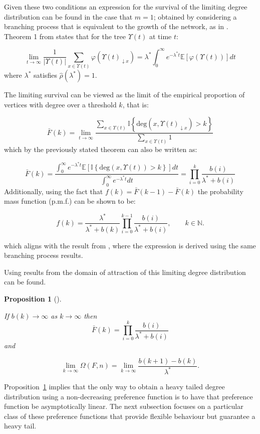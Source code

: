 \documentclass[
  sn-basic,
]{sn-jnl}
\theoremstyle{plain}
\newtheorem{proposition}{Proposition}[section]
\theoremstyle{remark}
\begin{document}
Given these two conditions an expression for the survival of the
limiting degree distribution can be found in the case that \(m=1\);
obtained by considering a branching process that is equivalent to the
growth of the network, as in \citep{rudas07}. Theorem 1 from
\citep{rudas07} states that for the tree \(\Upsilon(t)\) at time \(t\):

\[
\lim_{t\rightarrow\infty}\frac{1}{|\Upsilon(t)|}\sum_{x\in\Upsilon(t)}\varphi(\Upsilon(t)_{\downarrow x}) = \lambda^* \int_0^\infty e^{-\lambda^* t}\mathbb E\left[\varphi(\Upsilon(t))\right]dt
\] where \(\lambda^*\) satisfies \(\hat\rho(\lambda^*)=1\).

The limiting survival can be viewed as the limit of the empirical
proportion of vertices with degree over a threshold \(k\), that is:

\[
\bar F(k) = \lim_{t\rightarrow\infty}\frac{\sum_{x\in\Upsilon(t)}\mathbb I\left\{\text{deg}(x,\Upsilon(t)_{\downarrow x})>k\right\}}{\sum_{x\in\Upsilon(t)} 1}
\] which by the previously stated theorem can also be written as:

\[
\bar F(k) = \frac{\int_0^\infty e^{-\lambda^* t}\mathbb E\left[\mathbb I\left\{\text{deg}(x,\Upsilon(t))>k\right\}\right]dt}{\int_0^\infty e^{-\lambda^* t}dt} = \prod_{i=0}^k\frac{b(i)}{\lambda^* + b(i)}
\] Additionally, using the fact that \(f(k) = \bar F(k-1) - \bar F(k)\)
the probability mass function (p.m.f.) can be shown to be:

\[
f(k) = \frac{\lambda^*}{\lambda^* + b(k)}\prod_{i=0}^{k-1}\frac{b(i)}{\lambda^*+b(i)},\qquad k\in\mathbb N.
\]

which aligns with the result from \citep{rudas07}, where the expression
is derived using the same branching process results.

Using results from \citep{shimura12} the domain of attraction of this
limiting degree distribution can be found.

\begin{proposition}[]\protect\hypertarget{prp-omega}{}\label{prp-omega}

If \(b(k) \rightarrow \infty\) as \(k\rightarrow \infty\) then \[
\bar F(k) = \prod_{i=0}^k\frac{b(i)}{\lambda^* + b(i)}
\] and

\[
\lim_{k\rightarrow\infty}\Omega(F,n) = \lim_{k\rightarrow\infty}\frac{b(k+1)-b(k)}{\lambda^*}.
\]

\end{proposition}

Proposition~\ref{prp-omega} implies that the only way to obtain a heavy
tailed degree distribution using a non-decreasing preference function is
to have that preference function be asymptotically linear. The next
subsection focuses on a particular class of these preference functions
that provide flexible behaviour but guarantee a heavy tail.
\end{document}

